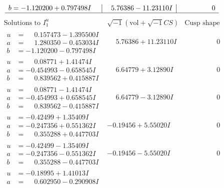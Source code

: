 \documentclass[1p]{elsarticle_modified}
\theoremstyle{definition}
\newcommand{\I}{\sqrt{-1}}
\begin{document}
$$\begin{array}{c|c|c}
\begin{aligned}
b &= -1.120200 + 0.797498 I\end{aligned}
 & \phantom{-}5.76386 - 11.23110 I & \phantom{-0.000000 } 0\\
 \hline 
 \end{array}$$\newpage$$\begin{array}{c|c|c}  
\text{Solutions to }I^u_{1}& \I (\text{vol} + \sqrt{-1}CS) & \text{Cusp shape}\\
 \hline 
\begin{aligned}
u &= \phantom{-}0.157473 - 1.395500 I \\
a &= \phantom{-}1.280350 - 0.453034 I \\
b &= -1.120200 - 0.797498 I\end{aligned}
 & \phantom{-}5.76386 + 11.23110 I & \phantom{-0.000000 } 0 \\ \hline\begin{aligned}
u &= \phantom{-}0.08771 + 1.41474 I \\
a &= -0.454993 - 0.658545 I \\
b &= \phantom{-}0.839562 + 0.415887 I\end{aligned}
 & \phantom{-}6.64779 + 3.12890 I & \phantom{-0.000000 } 0 \\ \hline\begin{aligned}
u &= \phantom{-}0.08771 - 1.41474 I \\
a &= -0.454993 + 0.658545 I \\
b &= \phantom{-}0.839562 - 0.415887 I\end{aligned}
 & \phantom{-}6.64779 - 3.12890 I & \phantom{-0.000000 } 0 \\ \hline\begin{aligned}
u &= -0.42499 + 1.35409 I \\
a &= -0.247356 + 0.551362 I \\
b &= \phantom{-}0.355288 + 0.447703 I\end{aligned}
 & -0.19456 + 5.55020 I & \phantom{-0.000000 } 0 \\ \hline\begin{aligned}
u &= -0.42499 - 1.35409 I \\
a &= -0.247356 - 0.551362 I \\
b &= \phantom{-}0.355288 - 0.447703 I\end{aligned}
 & -0.19456 - 5.55020 I & \phantom{-0.000000 } 0 \\ \hline\begin{aligned}
u &= -0.18995 + 1.41013 I \\
a &= \phantom{-}0.602950 - 0.290908 I \\

\end{aligned}
\end{array}$$
\end{document}
